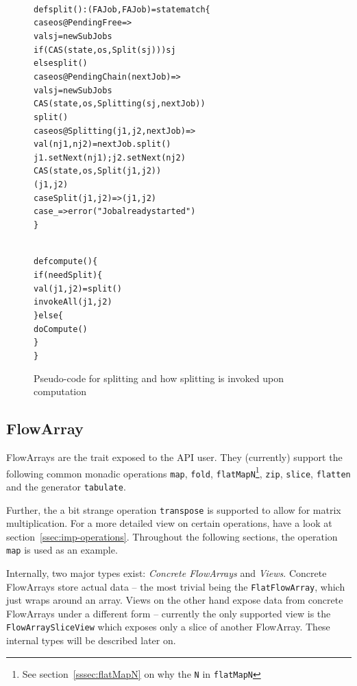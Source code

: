 \documentclass[runningheads,a4paper,fleqn]{llncs}
\begin{document}
\begin{figure}
\begin{minipage}[t]{7cm}
\begin{alltt}
{\scriptsize
def split(): (FAJob, FAJob) = state match \{
  case os@PendingFree =>
    val sj = newSubJobs
    if (CAS(state, os, Split(sj))) sj
    else split()
  case os@PendingChain(nextJob) =>
    val sj = newSubJobs
    CAS(state, os, Splitting(sj, nextJob))
    split()
  case os@Splitting(j1, j2, nextJob) =>
    val (nj1, nj2) = nextJob.split()
    j1.setNext(nj1); j2.setNext(nj2)
    CAS(state, os, Split(j1, j2))
    (j1, j2)
  case Split(j1, j2) => (j1, j2)
  case _ => error("Job already started")
\}
}
\end{alltt}
\end{minipage}
\begin{minipage}[t]{4cm}
\begin{alltt}
{\scriptsize
def compute() \{
  if (needSplit) \{
    val (j1, j2) = split()
    invokeAll(j1, j2)
  \} else \{
    doCompute()
  \}
\}
}
\end{alltt}
\end{minipage}
\caption{Pseudo-code for splitting and how splitting is invoked upon
  computation}
\label{fig:split-code}
\end{figure}

\subsection{FlowArray}
\label{ssec:flowarray}
FlowArrays are the trait exposed to the API user. They (currently)
support the following common monadic operations \texttt{map},
\texttt{fold}, \texttt{flatMapN}\footnote{See
  section~\ref{sssec:flatMapN} on why the \texttt{N} in
  \texttt{flatMapN}}, \texttt{zip}, \texttt{slice}, \texttt{flatten}
and the generator \texttt{tabulate}.

Further, the a bit strange operation \texttt{transpose} is supported
to allow for matrix multiplication. For a more detailed view on
certain operations, have a look at
section~\ref{ssec:imp-operations}. Throughout the following sections,
the operation \texttt{map} is used as an example.

Internally, two major types exist: \emph{Concrete FlowArrays} and
\emph{Views}. Concrete FlowArrays store actual data -- the most
trivial being the \texttt{FlatFlowArray}, which just wraps around an
array. Views on the other hand expose data from
concrete FlowArrays under a different form -- currently the
only supported view is the \texttt{FlowArraySliceView} which exposes
only a slice of another FlowArray. These internal types will be
described later on.
\end{document}
